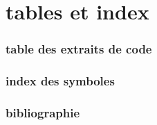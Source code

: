 \documentclass[A4,12pt]{scrartcl}%
\begin{document}
\part{tables et index}
\section{table des extraits de code}

\begin{multicols}{2}
\nowebchunks
\end{multicols}

\section{index des symboles}

\begin{multicols}{2}
\nowebindex
\end{multicols}

\listofdefinitions

\section{bibliographie}


% 

\end{document}
